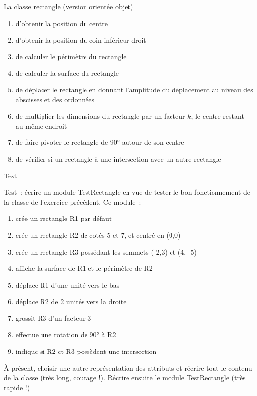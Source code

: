 \begin{Exercice}{La classe rectangle (version orientée objet)}
	\begin{enumerate}[label=\alph*)]
		\item 
			d’obtenir la position du centre
		\item 
			d’obtenir la position du coin inférieur droit
		\item 
			de calculer le périmètre du rectangle
		\item 
			de calculer la surface du rectangle
		\item 
			de déplacer le rectangle en donnant l’amplitude du déplacement au niveau
			des abscisses et des ordonnées
		\item 
			de multiplier les dimensions du rectangle par un facteur $k$, le centre
			restant au même endroit
		\item 
			de faire pivoter le rectangle de 90° autour de son centre
		\item 
			de vérifier si un rectangle à une intersection avec un autre rectangle
	\end{enumerate}
	
\end{Exercice}

\begin{Exercice}{Test}

	Test~: écrire un module TestRectangle en vue de tester le bon
	fonctionnement de la classe  de l'exercice précédent. Ce module~: 

	\begin{enumerate}[label=\alph*)]
		\item 
			crée un rectangle R1 par défaut
		\item 
			crée un rectangle R2 de cotés 5 et 7, et centré en (0,0)
		\item 
			crée un rectangle R3 possédant les sommets (-2,3) et (4, -5)
		\item 
			affiche la surface de R1 et le périmètre de R2
		\item 
			déplace R1 d’une unité vers le bas
		\item 
			déplace R2 de 2 unités vers la droite
		\item 
			grossit R3 d’un facteur 3
		\item 
			effectue une rotation de 90° à R2
		\item 
			indique si R2 et R3 possèdent une intersection
	\end{enumerate}

	À présent, choisir une autre représentation des attributs et récrire
	tout le contenu de la classe (très long, courage !).
	Récrire ensuite le
	module TestRectangle (très rapide !)
\end{Exercice}
